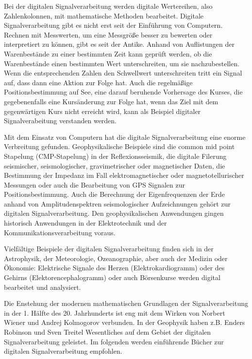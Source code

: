 Bei der digitalen Signalverarbeitung werden digitale Wertereihen, also Zahlenkolonnen, mit mathematische Methoden bearbeitet. Digitale Signalverarbeitung gibt es nicht erst seit der Einführung von Computern. Rechnen mit Messwerten, um eine Messgröße besser zu bewerten oder interpretiert zu können, gibt es seit der Antike. Anhand von Auflistungen der Warenbestände zu einer bestimmten Zeit kann geprüft werden, ob die Warenbestände einen bestimmten Wert unterschreiten, um sie nachzubestellen. Wenn die entsprechenden Zahlen den Schwellwert unterschreiten tritt ein Signal auf, dass dann eine Aktion zur Folge hat. Auch die regelmäßige Positionsbestimmung auf See, eine darauf beruhende Vorhersage des Kurses, die gegebenenfalls eine Kursänderung zur Folge hat, wenn das Ziel mit dem gegenwärtigen Kurs nicht erreicht wird, kann als Beispiel digitaler Signalverabeitung verstanden werden. 

Mit dem Einsatz von Computern hat die digitale Signalverarbeitung eine enorme Verbreitung gefunden. Geophysikalische Beispiele sind die common mid point Stapelung (CMP-Stapelung) in der Reflexionsseismik, die digitale Filerung seismischer, seismologischer, gravimetrischer oder magnetischer Daten, die Bestimmung der Impedanz im Fall elektromagnetischer oder magnetotellurischer Messungen oder auch die Bearbeitung von GPS Signalen zur Positionsbestimmung. Auch die Berechnung der Eigenfrequenzen der Erde anhand von Amplitudenspektren seismologischer Aufzeichnungen gehört zur digitalen Signalverarbeitung. Den geophysikalischen Anwendungen gingen historisch Anwendungen in der Elektrotechnik und der Kommunikationsverarbeitung voraus. 

Vielfältige Beispiele der digitalen Signalverarbeitung finden sich in der Astrophysik, der Meteorologie, Ozeanographie, aber auch der Medizin oder Ökonomie: Elektrische Signale des Herzen (Elektrokardiogramm) oder des Gehirns (Elektorencephalogramm) oder auch Börsenkurse werden digital bearbeitet und analysiert.

Die Enstehung der modernen mathematischen Grundlagen der Signalverarbeitung in der 1. Hälfte des 20. Jahrhunderts ist eng mit dem Wirken von Norbert Wiener und Andrej Kolmogorov verbunden. In der Geophysik haben z.B. Enders Robinson und Sven Treitel Wesentliches auf dem Gebiet der digitalen Signalverarbeitung geleistet. Im folgenden werden einführende Bücher zur digitalen Signalverarbeitung empfohlen.

\vspace{0.3cm}

